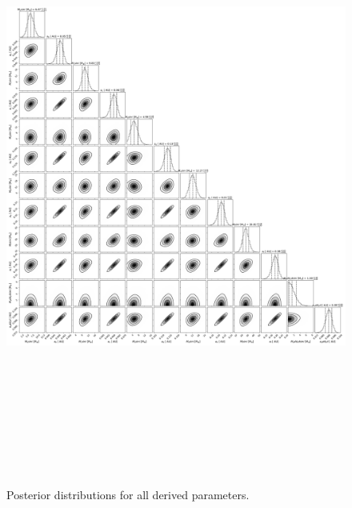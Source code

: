 \documentclass{emulateapj}
\begin{document}
\begin{figure}[!h]
\centering

\includegraphics[height=8.0in,width=6.0in,keepaspectratio]{TOI-1246_add_cd_corner_derived_pars.pdf}
\caption{Posterior distributions for all derived parameters.}
\end{figure} 

\end{document}
